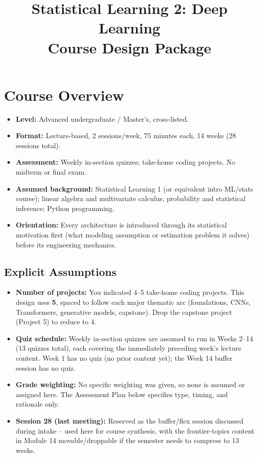 \documentclass[11pt]{article}
\title{Statistical Learning 2: Deep Learning\\[4pt]\large Course Design Package}
\author{}
\date{}
\begin{document}
\maketitle

\section*{Course Overview}
\begin{itemize}
  \item \textbf{Level:} Advanced undergraduate / Master's, cross-listed.
  \item \textbf{Format:} Lecture-based, 2 sessions/week, 75 minutes each, 14 weeks (28 sessions total).
  \item \textbf{Assessment:} Weekly in-section quizzes; take-home coding projects. No midterm or final exam.
  \item \textbf{Assumed background:} Statistical Learning 1 (or equivalent intro ML/stats course); linear algebra and multivariate calculus; probability and statistical inference; Python programming.
  \item \textbf{Orientation:} Every architecture is introduced through its statistical motivation first (what modeling assumption or estimation problem it solves) before its engineering mechanics.
\end{itemize}

\subsection*{Explicit Assumptions}
\begin{itemize}
  \item \textbf{Number of projects:} You indicated 4--5 take-home coding projects. This design uses \textbf{5}, spaced to follow each major thematic arc (foundations, CNNs, Transformers, generative models, capstone). Drop the capstone project (Project 5) to reduce to 4.
  \item \textbf{Quiz schedule:} Weekly in-section quizzes are assumed to run in Weeks 2--14 (13 quizzes total), each covering the immediately preceding week's lecture content. Week 1 has no quiz (no prior content yet); the Week 14 buffer session has no quiz.
  \item \textbf{Grade weighting:} No specific weighting was given, so none is assumed or assigned here. The Assessment Plan below specifies type, timing, and rationale only.
  \item \textbf{Session 28 (last meeting):} Reserved as the buffer/flex session discussed during intake -- used here for course synthesis, with the frontier-topics content in Module 14 movable/droppable if the semester needs to compress to 13 weeks.
\end{itemize}
\end{document}
